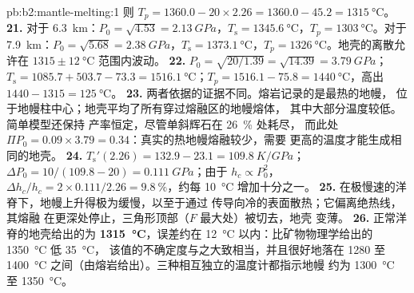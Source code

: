 \begin{solution}{pb:b2:mantle-melting:1}
则 $T_p = 1360.0 - 20\times2.26 = 1360.0 - 45.2 = \qty{1315}{\celsius}$。
\textbf{21.} 对于 \qty{6.3}{km}：$P_0 = \sqrt{4.53} = \qty{2.13}{GPa}$，$T_{\mathrm s}
= \qty{1345.6}{\celsius}$，$T_p = \qty{1303}{\celsius}$。对于 \qty{7.9}{km}：$P_0 =
\sqrt{5.68} = \qty{2.38}{GPa}$，$T_{\mathrm s} = \qty{1373.1}{\celsius}$，$T_p =
\qty{1326}{\celsius}$。地壳的离散允许在 $1315 \pm
\qty{12}{\celsius}$ 范围内波动。
\textbf{22.} $P_0 = \sqrt{20/1.39} = \sqrt{14.39} = \qty{3.79}{GPa}$；$T_{\mathrm s} =
1085.7 + 503.7 - 73.3 = \qty{1516.1}{\celsius}$；$T_p = 1516.1 - 75.8 =
\qty{1440}{\celsius}$，高出 $1440 - 1315 = \qty{125}{\celsius}$。
\textbf{23.} 两者依据的证据不同。熔岩记录的是最热的地幔，
位于地幔柱中心；地壳平均了所有穿过熔融区的地幔熔体，
其中大部分温度较低。简单模型还保持
产率恒定，尽管单斜辉石在 \qty{26}{\percent} 处耗尽，
而此处 $\Pi P_0 = 0.09\times3.79 = 0.34$：真实的热地幔熔融较少，需要
更高的温度才能生成相同的地壳。
\textbf{24.} $T_{\mathrm s}'(2.26) = 132.9 - 23.1 = \qty{109.8}{K/GPa}$；$\Delta P_0 =
10/(109.8 - 20) = \qty{0.111}{GPa}$；由于 $h_c \propto P_0^2$，$\Delta h_c/h_c =
2\times0.111/2.26 = \qty{9.8}{\percent}$，约每 \qty{10}{\celsius} 增加十分之一。
\textbf{25.} 在极慢速的洋脊下，地幔上升得极为缓慢，以至于通过
传导向冷的表面散热；它偏离绝热线，其熔融
在更深处停止，三角形顶部（$F$ 最大处）被切去，地壳
变薄。
\textbf{26.} 正常洋脊的地壳给出的为
\textbf{\qty[text-series-to-math=true]{1315}{\celsius}}，误差约在
\qty{12}{\celsius} 以内：比矿物物理学给出的 \qty{1350}{\celsius} 低 \qty{35}{\celsius}，
该值的不确定度与之大致相当，并且很好地落在 1280 至
\qty{1400}{\celsius} 之间（由熔岩给出）。三种相互独立的温度计都指示地幔
约为 \qty{1300}{\celsius} 至 \qty{1350}{\celsius}。
\end{solution}
